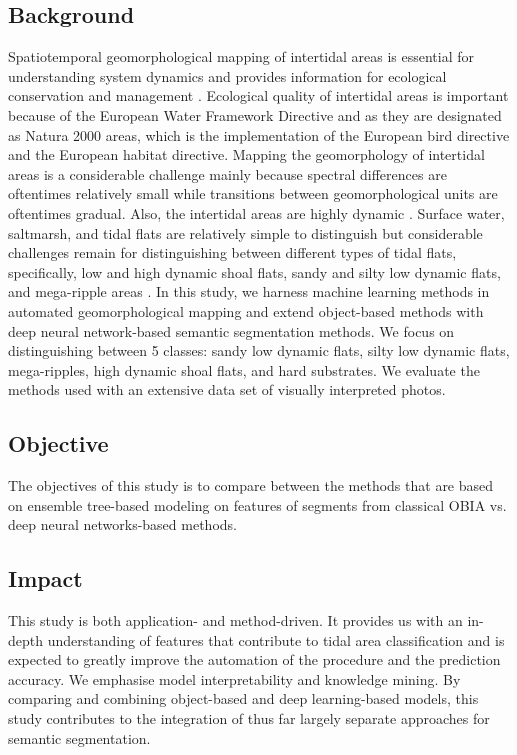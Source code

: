 \documentclass{isprs} %
\begin{document}
\subsection{Background}
\label{sec:Introduction}
Spatiotemporal geomorphological mapping of intertidal areas is essential for understanding system dynamics and provides information for ecological conservation and management \citep{bouma2005zoute}. Ecological quality of intertidal areas is important because of the European Water Framework Directive and as they are designated as Natura 2000 areas, which is the implementation of the European bird directive and the European habitat directive. Mapping the geomorphology of intertidal areas is a considerable challenge mainly because spectral differences are oftentimes relatively small while transitions between geomorphological units are oftentimes gradual. Also, the intertidal areas are highly dynamic \citep{kleinhans2019tidal}. Surface water, saltmarsh, and tidal flats are relatively simple to distinguish but considerable challenges remain for distinguishing between different types of tidal flats, specifically, low and high dynamic shoal flats, sandy and silty low dynamic flats, and mega-ripple areas \citep{Douma2019}. In this study, we harness machine learning methods in automated geomorphological mapping and extend object-based methods with deep neural network-based semantic segmentation methods. We focus on distinguishing between 5 classes:  sandy low dynamic flats, silty low dynamic flats, mega-ripples, high dynamic shoal flats, and hard substrates. We evaluate the methods used with an extensive data set of visually interpreted photos.

\subsection{Objective}

The objectives of this study is to compare between the methods that are based on ensemble tree-based modeling on features of segments from classical OBIA vs. deep neural networks-based methods.

\subsection{Impact}
This study is both application- and method-driven. It provides us with an in-depth understanding of features that contribute to tidal area classification and is expected to greatly improve the automation of the procedure and the prediction accuracy. We emphasise model interpretability and knowledge mining. By comparing and combining object-based and deep learning-based models, this study contributes to the integration of thus far largely separate approaches for semantic segmentation. 
\end{document}
